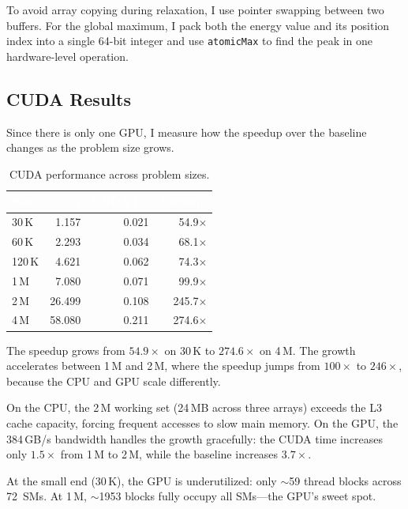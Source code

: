 \documentclass[10pt,dvipsnames,table,twocolumn]{article}
\let\oldtexttt\texttt
\renewcommand{\texttt}[1]{%
  {\small\colorbox{Mist}{\oldtexttt{\textcolor{DarkInk}{#1}}}}%
}
\begin{document}
To avoid array copying during relaxation, I use pointer swapping between two buffers. For the global maximum, I pack both the energy value and its position index into a single 64-bit integer and use \texttt{atomicMax} to find the peak in one hardware-level operation.


\subsection{CUDA Results}\label{sec:cuda-results}

Since there is only one GPU, I measure how the speedup over the baseline changes as the problem size grows.

\begin{table}[t]
\centering
\caption{CUDA performance across problem sizes.}\label{tbl:cuda}
\small
\begin{tabular}{@{}lrrr@{}}
\rowcolor{TableHead}
\textcolor{white}{\textbf{Size}} &
\textcolor{white}{\textbf{$T_s$ (s)}} &
\textcolor{white}{\textbf{CUDA (s)}} &
\textcolor{white}{\textbf{Speedup}} \\
\midrule
30\,K   & 1.157  & 0.021  & 54.9$\times$ \\
\rowcolor{TableRowAlt}
60\,K   & 2.293  & 0.034  & 68.1$\times$ \\
120\,K  & 4.621  & 0.062  & 74.3$\times$ \\
\rowcolor{TableRowAlt}
1\,M    & 7.080  & 0.071  & 99.9$\times$ \\
2\,M    & 26.499 & 0.108  & 245.7$\times$ \\
\rowcolor{TableRowAlt}
4\,M    & 58.080 & 0.211  & 274.6$\times$ \\
\bottomrule
\end{tabular}
\end{table}

The speedup grows from $54.9\times$ on 30\,K to $274.6\times$ on 4\,M. The growth accelerates between 1\,M and 2\,M, where the speedup jumps from $100\times$ to $246\times$, because the CPU and GPU scale differently.

On the CPU, the 2\,M working set (24\,MB across three arrays) exceeds the L3 cache capacity, forcing frequent accesses to slow main memory. On the GPU, the 384\,GB/s bandwidth handles the growth gracefully: the CUDA time increases only $1.5\times$ from 1\,M to 2\,M, while the baseline increases $3.7\times$.

At the small end (30\,K), the GPU is underutilized: only $\sim$59 thread blocks across 72~SMs. At 1\,M, $\sim$1953 blocks fully occupy all SMs---the GPU's sweet spot.
\end{document}
